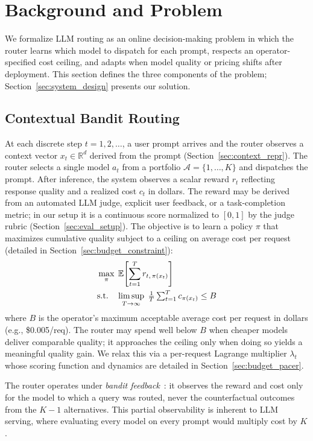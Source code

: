\section{Background and Problem}
\label{sec:background}

We formalize LLM routing as an online decision-making problem in which the router learns which model to dispatch for each prompt, respects an operator-specified cost ceiling, and adapts when model quality or pricing shifts after deployment. This section defines the three components of the problem; Section~\ref{sec:system_design} presents our solution.

\subsection{Contextual Bandit Routing}
\label{sec:bandit_routing}

At each discrete step $t = 1, 2, \ldots$, a user prompt arrives and the router observes a context vector $x_t \in \mathbb{R}^d$ derived from the prompt (Section~\ref{sec:context_repr}). The router selects a single model $a_t$ from a portfolio $\mathcal{A} = \{1, \ldots, K\}$ and dispatches the prompt. After inference, the system observes a scalar reward $r_t$ reflecting response quality and a realized cost $c_t$ in dollars. The reward may be derived from an automated LLM judge, explicit user feedback, or a task-completion metric; in our setup it is a continuous score normalized to $[0, 1]$ by the judge rubric (Section~\ref{sec:eval_setup}). The objective is to learn a policy $\pi$ that maximizes cumulative quality subject to a ceiling on average cost per request (detailed in Section~\ref{sec:budget_constraint}):
\begin{align}
    &\max_{\pi}\; \mathbb{E}\!\left[\sum_{t=1}^{T} r_{t,\,\pi(x_t)}\right]
    \label{eq:objective} \\
    &\text{s.t.}\quad
    \limsup_{T \to \infty}\;\tfrac{1}{T}\textstyle\sum_{t=1}^{T} c_{\pi(x_t)} \leq B
    \notag
\end{align}
where $B$ is the operator's maximum acceptable average cost per request in dollars (e.g., \$0.005/req). The router may spend well below $B$ when cheaper models deliver comparable quality; it approaches the ceiling only when doing so yields a meaningful quality gain. We relax this via a per-request Lagrange multiplier $\lambda_t$ whose scoring function and dynamics are detailed in Section~\ref{sec:budget_pacer}.

The router operates under \emph{bandit feedback}~\cite{lattimore2020bandit}: it observes the reward and cost only for the model to which a query was routed, never the counterfactual outcomes from the $K{-}1$ alternatives. This partial observability is inherent to LLM serving, where evaluating every model on every prompt would multiply cost by $K$.

